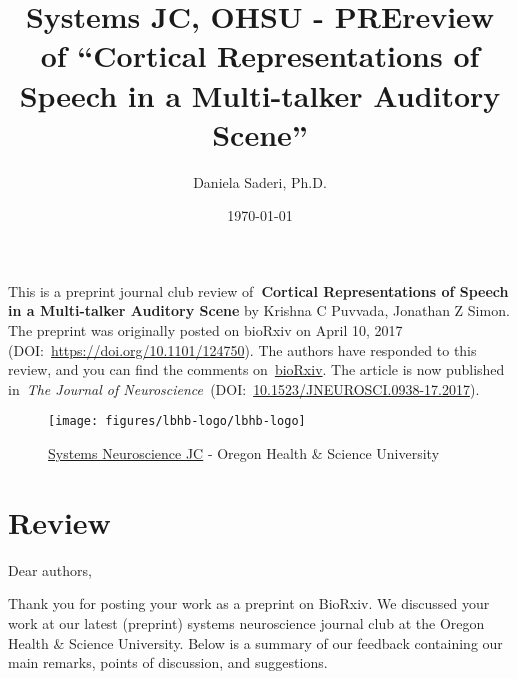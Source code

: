 \documentclass[10pt]{article}
\renewenvironment{abstract}
  {{\bfseries\noindent{\abstractname}\par\nobreak}\footnotesize}
  {\bigskip}
\begin{document}
\title{Systems JC, OHSU - PREreview of ``Cortical Representations of Speech in
a Multi-talker Auditory Scene''}



\author[1]{Daniela Saderi, Ph.D.}%
%


\vspace{-1em}



  \date{\today}


\begingroup
\let\center\flushleft
\let\endcenter\endflushleft
\maketitle
\endgroup





\begin{abstract}
This is a preprint journal club review of\textbf{~Cortical
Representations of Speech in a Multi-talker Auditory Scene} by Krishna C
Puvvada, Jonathan Z Simon. The preprint was originally posted on bioRxiv
on April 10, 2017 (DOI:~\url{https://doi.org/10.1101/124750}). The
authors have responded to this review, and you can find the comments
on~\href{https://www.biorxiv.org/content/early/2017/04/10/124750}{bioRxiv}.
The article is now published in~\emph{The Journal of
Neuroscience~}(DOI:~\href{http://dx.doi.org/10.1523/JNEUROSCI.0938-17.2017}{10.1523/JNEUROSCI.0938-17.2017}).
~%
\end{abstract}%




\begin{figure}[h!]
\begin{center}
\texttt{[image: figures/lbhb-logo/lbhb-logo]}
\caption{{\href{https://hearingbrain.org/systemsjournalclub.php}{Systems
Neuroscience JC} - Oregon Health \& Science University
{\label{248803}}%
}}
\end{center}
\end{figure}

\section*{Review}

{\label{993054}}

Dear authors,

Thank you for posting your work as a preprint on BioRxiv. We discussed
your work at our latest (preprint) systems neuroscience journal club at
the Oregon Health \& Science University. Below is a summary of our
feedback containing our main remarks, points of discussion, and
suggestions.
\end{document}
